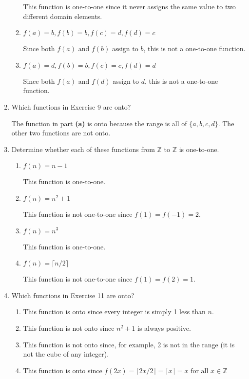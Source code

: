 \documentclass[11pt]{article}
\begin{document}
\begin{enumerate}[label=\textbf{\arabic*.}]
\begin{enumerate}[label=\textbf{\alph*)}]
		This function is one-to-one since it never assigns the same value to two different domain elements.
		
		\item $f(a) = b, f(b) = b, f(c) = d, f(d) = c$
		
		Since both $f(a)$ and $f(b)$ assign to $b$, this is not a one-to-one function.
		
		\item $f(a) = d, f(b) = b, f(c) = c, f(d) = d$
		
		Since both $f(a)$ and $f(d)$ assign to $d$, this is not a one-to-one function.
	\end{enumerate}

	\item Which functions in Exercise 9 are onto?
	
	The function in part \textbf{(a)} is onto because the range is all of $\{a, b, c, d\}$. The other two functions are not onto.
	
	\item Determine whether each of these functions from $\mathbb{Z}$ to $\mathbb{Z}$ is one-to-one.
	
	\begin{enumerate}[label=\textbf{\alph*)}]
		\item $f(n) = n - 1$
		
		This function is one-to-one.
		
		\item $f(n) = n^2 + 1$
		
		This function is not one-to-one since $f(1) = f(-1) = 2$.
		
		\item $f(n) = n^3$
		
		This function is one-to-one.
		
		\item $f(n) = \lceil n / 2 \rceil$
		
		This function is not one-to-one since $f(1) = f(2) = 1$.
	\end{enumerate}

	\item Which functions in Exercise 11 are onto?
	
	\begin{enumerate}[label=\textbf{\alph*)}]
		\item This function is onto since every integer is simply 1 less than $n$.
		\item This function is not onto since $n^2 + 1$ is always positive.
		\item This function is not onto since, for example, 2 is not in the range (it is not the cube of any integer).
		\item This function is onto since $f(2x) = \lceil 2x / 2 \rceil = \lceil x \rceil = x \text{ for all } x \in \mathbb{Z}$
	\end{enumerate}


\end{enumerate}
\end{document}
